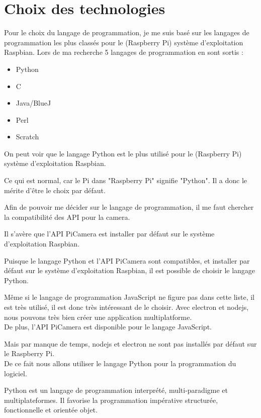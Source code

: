     \section{Choix des technologies}
        Pour le choix du langage de programmation, je me suis basé sur les langages de programmation les plus classés pour le (Raspberry Pi) système d'exploitation Raspbian.
        Lors de ma recherche 5 langages de programmation en sont sortis : 

        \vspace{0.2cm}

        \begin{itemize}
            \item Python
            \item C
            \item Java/BlueJ
            \item Perl
            \item Scratch
        \end{itemize}

        \begin{flushleft}
            On peut voir que le langage Python est le plus utilisé pour le (Raspberry Pi) système d'exploitation Raspbian.

            Ce qui est normal, car le Pi dans "Raspberry Pi" signifie "Python". Il a donc le mérite d'être le choix par défaut.

            Afin de pouvoir me décider sur le langage de programmation, il me faut chercher la compatibilité des API pour la camera. 

            Il s'avère que l'API PiCamera est installer par défaut sur le système d'exploitation Raspbian.

            Puisque le langage Python et l'API PiCamera sont compatibles, et installer par défaut sur le système d'exploitation Raspbian, il est possible de choisir le langage Python.
        
            Même si le langage de programmation JavaScript ne figure pas dans cette liste, il est très utilisé, il est donc très intéressant de le choisir.
            Avec electron et nodejs, nous pouvons très bien créer une application multiplatforme.\\[0.2cm]
            De plus, l'API PiCamera est disponible pour le langage JavaScript.
        
            Mais par manque de temps, nodejs et electron ne sont pas installés par défaut sur le Raspberry Pi.\\[0.2cm]
        
            De ce fait nous allons utiliser le langage Python pour la programmation du logiciel.
            
            Python est un langage de programmation interprété, multi-paradigme et multiplateformes. Il favorise la programmation impérative structurée, fonctionnelle et orientée objet.
            
        \end{flushleft}

